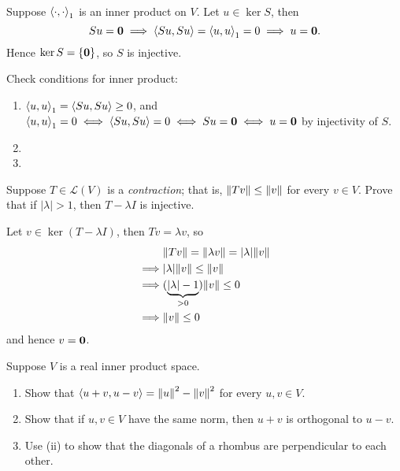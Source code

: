 \begin{solution} \

\fbox{$\implies$} Suppose $\left\langle\cdot,\cdot\right\rangle_1$ is an inner product on $V$. Let $u\in\ker S$, then
\[Su=\vb{0}\implies\left\langle Su,Su\right\rangle=\left\langle u,u\right\rangle_1=0\implies u=\vb{0}.\]
Hence $\ker S=\{\vb{0}\}$, so $S$ is injective.

\fbox{$\impliedby$} Check conditions for inner product:
\begin{enumerate}[label=(\roman*)]
\item $\left\langle u,u\right\rangle_1=\left\langle Su,Su\right\rangle\ge0$, and $\left\langle u,u\right\rangle_1=0\iff\left\langle Su,Su\right\rangle=0\iff Su=\vb{0}\iff u=\vb{0}$ by injectivity of $S$.
\item 
\item 
\end{enumerate}
\end{solution}

\begin{exercise}
Suppose $T\in\mathcal{L}(V)$ is a \emph{contraction}; that is, $\norm{Tv}\le\norm{v}$ for every $v\in V$. Prove that if $|\lambda|>1$, then $T-\lambda I$ is injective.
\end{exercise}

\begin{solution}
Let $v\in\ker(T-\lambda I)$, then $Tv=\lambda v$, so
\begin{align*}
&\norm{Tv}=\norm{\lambda v}=|\lambda|\norm{v}\\
\implies&|\lambda|\norm{v}\le\norm{v}\\
\implies&(\underbrace{|\lambda|-1}_{>0})\norm{v}\le0\\
\implies&\norm{v}\le0
\end{align*}
and hence $v=\vb{0}$.
\end{solution}

\begin{exercise}
Suppose $V$ is a real inner product space.
\begin{enumerate}[label=(\roman*)]
\item Show that $\left\langle u+v,u-v\right\rangle=\norm{u}^2-\norm{v}^2$ for every $u,v\in V$.
\item Show that if $u,v\in V$ have the same norm, then $u+v$ is orthogonal to $u-v$.
\item Use (ii) to show that the diagonals of a rhombus are perpendicular to each other.
\end{enumerate}
\end{exercise}

